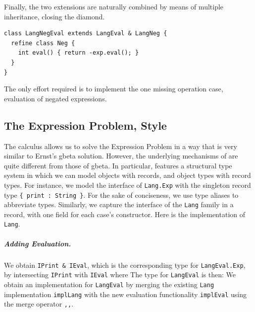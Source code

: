 Finally, the two extensions are naturally combined by means of
multiple inheritance, closing the diamond.
\begin{lstlisting}[language=gbeta]
class LangNegEval extends LangEval & LangNeg {
  refine class Neg {
    int eval() { return -exp.eval(); }
  }
}
\end{lstlisting}
The only effort required is to implement the one missing operation
case, evaluation of negated expressions.


\subsection{The Expression Problem, \name Style}

The \name calculus allows us to solve the Expression Problem in a way that is
very similar to Ernst's gbeta solution. However, the underlying mechanisms of
\name are quite different from those of gbeta. In particular, \name features a
structural type system in which we can model objects with records, and object
types with record types. For instance, we model the interface of \lstinline{Lang.Exp}
with the singleton record type \lstinline${ print : String }$. For the sake of
conciseness, we use type aliases to abbreviate types.
Similarly, we capture the interface of the \lstinline{Lang} family in a record,
with one field for each case's constructor.
Here is the implementation of \lstinline{Lang}.

\subparagraph{Adding Evaluation.}
We obtain \lstinline{IPrint & IEval}, which is the corresponding type for \lstinline{LangEval.Exp}, by
intersecting \lstinline{IPrint} with \lstinline{IEval} where
The type for \lstinline{LangEval} is then:
We obtain an implementation for \lstinline{LangEval} by merging the existing
\lstinline{Lang} implementation \lstinline{implLang} with the new evaluation
functionality \lstinline{implEval} using the merge operator \lstinline{,,}.

